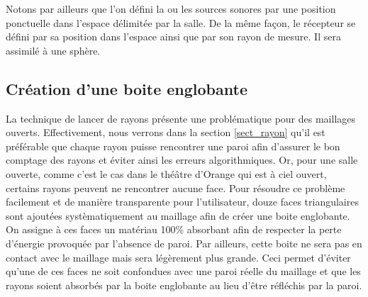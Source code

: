 Notons par ailleurs que l'on défini la ou les sources sonores par une position ponctuelle dans l'espace délimitée par la salle. De la même façon, le récepteur se défini par sa position dans l'espace ainsi que par son rayon de mesure. Il sera assimilé à une sphère.

\subsection{Création d'une boite englobante}

La technique de lancer de rayons présente une problématique pour des maillages ouverts. Effectivement, nous verrons dans la section \ref{sect_rayon} qu'il est préférable que chaque rayon puisse rencontrer une paroi afin d'assurer le bon comptage des rayons et éviter ainsi les erreurs algorithmiques. Or, pour une salle ouverte, comme c'est le cas dans le théâtre d'Orange qui est à ciel ouvert, certains rayons peuvent ne rencontrer aucune face. Pour résoudre ce problème facilement et de manière transparente pour l'utilisateur, douze faces triangulaires sont ajoutées systèmatiquement au maillage afin de créer une boite englobante. On assigne à ces faces un matériau 100\% absorbant afin de respecter la perte d'énergie provoquée par l'absence de paroi. Par ailleurs, cette boite ne sera pas en contact avec le maillage mais sera légèrement plus grande. Ceci permet d'éviter qu'une de ces faces ne soit confondues avec une paroi réelle du maillage et que les rayons soient absorbés par la boite englobante au lieu d'être réfléchis par la paroi.

